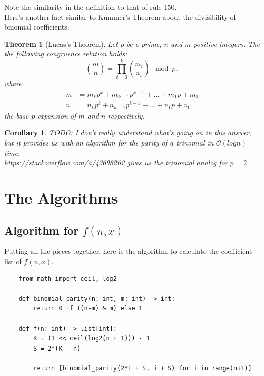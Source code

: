 \documentclass{article}
\newtheorem{theorem}{Theorem}
\newtheorem{corollary}{Corollary}
\renewcommand{\O}{\mathcal{O}}
\begin{document}
	Note the similarity in the definition to that of rule 150. \\

	Here's another fact similar to Kummer's Theorem about the divisibility of binomial coefficients.
	\begin{theorem}[Lucas's Theorem]
		Let $p$ be a prime, $n$ and $m$ positive integers.
		The the following congruence relation holds:
		\begin{equation*}
			\binom{m}{n} = \prod_{i=0}^{k}{\binom{m_i}{n_i}} \mod p,
		\end{equation*}
		where
		\begin{align*}
			m &= m_kp^k + m_{k-1}p^{k-1} + \dots + m_1p + m_0 \\
			n &= n_kp^k + n_{k-1}p^{k-1} + \dots + n_1p + n_0,
		\end{align*}
		the base $p$ expansion of $m$ and $n$ respectively.
	\end{theorem}

	\begin{corollary}
		TODO: I don't really understand what's going on in this answer, but it provides us with an algorithm for the parity of a trinomial in $\O(log n)$ time. \\
		
		\href{https://stackoverflow.com/a/43698262}{https://stackoverflow.com/a/43698262} gives us the trinomial analog for $p=2$.
	\end{corollary}

	\section{The Algorithms}
	\subsection{Algorithm for $f(n,x)$}
	Putting all the pieces together, here is the algorithm to calculate the coefficient list of $f(n,x)$.
	
	\begin{center}
	\begin{verbatim}
	from math import ceil, log2
		
	def binomial_parity(n: int, m: int) -> int:
	    return 0 if ((n-m) & m) else 1
		
	def f(n: int) -> list[int]:
	    K = (1 << ceil(log2(n + 1))) - 1
	    S = 2*(K - n)
	    
	    return [binomial_parity(2*i + S, i + S) for i in range(n+1)]
	\end{verbatim}
	\end{center}
\end{document}
